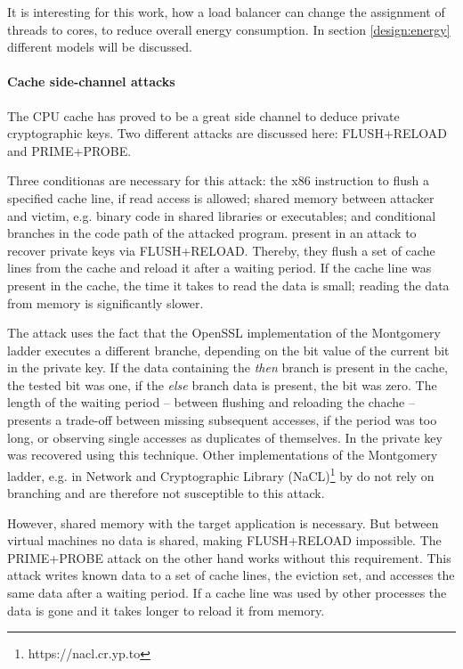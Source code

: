 It is interesting for this work, how a load balancer can change the assignment
of threads to cores, to reduce overall energy consumption.
In section \ref{design:energy} different models will be discussed.
\\

\paragraph{Cache side-channel attacks}
The CPU cache has proved to be a great side channel to deduce private
cryptographic keys.
Two different attacks are discussed here: FLUSH+RELOAD and PRIME+PROBE.

Three conditionas are necessary for this attack:
the x86 instruction to flush a specified cache line, if read access is allowed;
shared memory between attacker and victim, e.g. binary
code in shared libraries or executables;
and conditional branches in the code path of the attacked program.
\citeauthor{yarom_recovering_2014} present in \cite{yarom_recovering_2014} an
attack to recover private keys via FLUSH+RELOAD.
Thereby, they flush a set of cache lines from the cache and reload it after a
waiting period.
If the cache line was present in the cache, the time it takes to read the data
is small; reading the data from memory is significantly slower.

The attack uses the fact that the OpenSSL implementation of the Montgomery
ladder executes a different branche, depending on the bit value of the current
bit in the private key.
If the data containing the \textit{then} branch is present in the cache, the
tested bit was one, if the \textit{else} branch data is present, the bit was
zero.
The length of the waiting period -- between flushing and reloading the chache
-- presents a trade-off between missing subsequent accesses, if the period was
too long, or observing single accesses as duplicates of themselves.
In \cite{yarom_recovering_2014} the private key was recovered using this
technique.
Other implementations of the Montgomery ladder, e.g. in Network and
Cryptographic Library (NaCL)\footnote{https://nacl.cr.yp.to} by
\citeauthor{bernstein_security_2012}
do not rely on branching and are therefore not susceptible to this attack.

However, shared memory with the target application is necessary.
But between virtual machines no data is shared, making FLUSH+RELOAD
impossible.
The PRIME+PROBE attack on the other hand works without this requirement.
This attack writes known data to a set of cache lines, the eviction set,
and accesses the same data after a waiting period.
If a cache line was used by other processes the data is gone and it takes
longer to reload it from memory.


